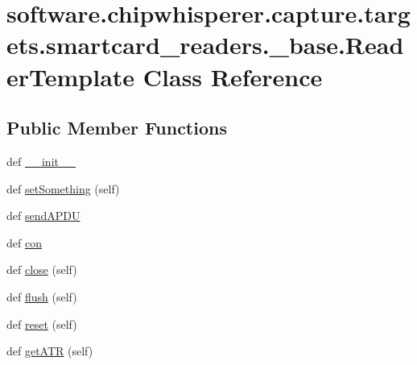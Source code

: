 \hypertarget{classsoftware_1_1chipwhisperer_1_1capture_1_1targets_1_1smartcard__readers_1_1__base_1_1ReaderTemplate}{}\section{software.\+chipwhisperer.\+capture.\+targets.\+smartcard\+\_\+readers.\+\_\+base.\+Reader\+Template Class Reference}
\label{classsoftware_1_1chipwhisperer_1_1capture_1_1targets_1_1smartcard__readers_1_1__base_1_1ReaderTemplate}
\subsection*{Public Member Functions}
\begin{DoxyCompactItemize}
\item 
def \hyperlink{classsoftware_1_1chipwhisperer_1_1capture_1_1targets_1_1smartcard__readers_1_1__base_1_1ReaderTemplate_a3ce444600f162f12fcdfd56f20a552f8}{\+\_\+\+\_\+init\+\_\+\+\_\+}
\item 
def \hyperlink{classsoftware_1_1chipwhisperer_1_1capture_1_1targets_1_1smartcard__readers_1_1__base_1_1ReaderTemplate_a6803750fc338825d0ce9285c8953a975}{set\+Something} (self)
\item 
def \hyperlink{classsoftware_1_1chipwhisperer_1_1capture_1_1targets_1_1smartcard__readers_1_1__base_1_1ReaderTemplate_a6dd4bac52c53596deaeba2317d5f1cc3}{send\+A\+P\+D\+U}
\item 
def \hyperlink{classsoftware_1_1chipwhisperer_1_1capture_1_1targets_1_1smartcard__readers_1_1__base_1_1ReaderTemplate_aa08e66f311682d5f31e6386cce40d1bf}{con}
\item 
def \hyperlink{classsoftware_1_1chipwhisperer_1_1capture_1_1targets_1_1smartcard__readers_1_1__base_1_1ReaderTemplate_ad67156c253b13766b75a9d9ec30eada6}{close} (self)
\item 
def \hyperlink{classsoftware_1_1chipwhisperer_1_1capture_1_1targets_1_1smartcard__readers_1_1__base_1_1ReaderTemplate_ab1fd82308ca2d4fa73599c4fa3709521}{flush} (self)
\item 
def \hyperlink{classsoftware_1_1chipwhisperer_1_1capture_1_1targets_1_1smartcard__readers_1_1__base_1_1ReaderTemplate_a2e95870428aabbaaa1fef8d1056ec904}{reset} (self)
\item 
def \hyperlink{classsoftware_1_1chipwhisperer_1_1capture_1_1targets_1_1smartcard__readers_1_1__base_1_1ReaderTemplate_ab4906c17e9cfe5d4267428937d6652d3}{get\+A\+T\+R} (self)
\end{DoxyCompactItemize}


